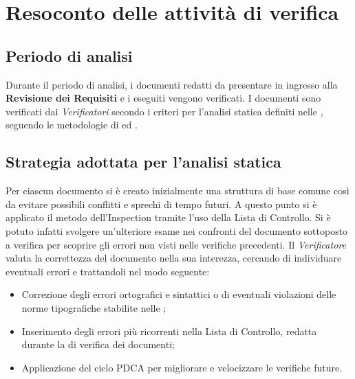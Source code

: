 \section{Resoconto delle attività di verifica}
\label{resoconto}
\subsection{Periodo di analisi}
Durante il periodo di analisi, i documenti redatti da presentare in ingresso alla \textbf{Revisione dei Requisiti} e i  eseguiti vengono verificati. I documenti sono verificati dai \textit{Verificatori} secondo i criteri per l'analisi statica definiti nelle , seguendo le metodologie di  ed .
\subsection{Strategia adottata per l'analisi statica}
Per ciascun documento si è creato inizialmente una struttura di base comune così da evitare possibili conflitti e sprechi di tempo futuri. A questo punto si è applicato il metodo dell'Inspection tramite l'uso della Lista di Controllo. Si è potuto infatti svolgere un’ulteriore esame nei confronti del documento sottoposto a verifica per scoprire gli errori non visti nelle verifiche precedenti. Il \textit{Verificatore} valuta la correttezza del documento nella sua interezza, cercando di individuare eventuali errori e trattandoli nel modo seguente:
	\begin{itemize}
		\item Correzione degli errori ortografici e sintattici o di eventuali violazioni delle norme tipografiche stabilite nelle ;
		\item Inserimento degli errori più ricorrenti nella Lista di Controllo, redatta durante la  di verifica dei documenti;
		\item Applicazione del ciclo PDCA per migliorare e velocizzare le verifiche future.
	\end{itemize}
